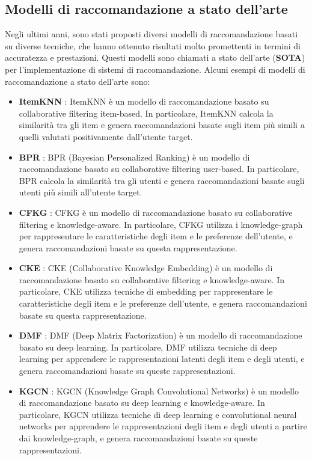 \subsection{Modelli di raccomandazione a stato dell'arte}
Negli ultimi anni, sono stati proposti diversi modelli di raccomandazione basati su diverse tecniche, che hanno ottenuto risultati molto promettenti in termini di accuratezza e prestazioni. Questi modelli sono chiamati a stato dell'arte (\textbf{SOTA}) per l'implementazione di sistemi di raccomandazione. Alcuni esempi di modelli di raccomandazione a stato dell'arte sono:
\begin{itemize}
    \item \textbf{ItemKNN} \cite{ItemKNN}: ItemKNN è un modello di raccomandazione basato su collaborative filtering item-based. In particolare, ItemKNN calcola la similarità tra gli item e genera raccomandazioni basate sugli item più simili a quelli valutati positivamente dall'utente target.
    \item \textbf{BPR} \cite{BPR}: BPR (Bayesian Personalized Ranking) è un modello di raccomandazione basato su collaborative filtering user-based. In particolare, BPR calcola la similarità tra gli utenti e genera raccomandazioni basate sugli utenti più simili all'utente target.
    \item \textbf{CFKG} \cite{CFKG}: CFKG è un modello di raccomandazione basato su collaborative filtering e knowledge-aware. In particolare, CFKG utilizza i knowledge-graph per rappresentare le caratteristiche degli item e le preferenze dell'utente, e genera raccomandazioni basate su questa rappresentazione.
    \item \textbf{CKE} \cite{CKE}: CKE (Collaborative Knowledge Embedding) è un modello di raccomandazione basato su collaborative filtering e knowledge-aware. In particolare, CKE utilizza tecniche di embedding per rappresentare le caratteristiche degli item e le preferenze dell'utente, e genera raccomandazioni basate su questa rappresentazione.
    \item \textbf{DMF} \cite{DMF}: DMF (Deep Matrix Factorization) è un modello di raccomandazione basato su deep learning. In particolare, DMF utilizza tecniche di deep learning per apprendere le rappresentazioni latenti degli item e degli utenti, e genera raccomandazioni basate su queste rappresentazioni.
    \item \textbf{KGCN} \cite{KGCN}: KGCN (Knowledge Graph Convolutional Networks) è un modello di raccomandazione basato su deep learning e knowledge-aware. In particolare, KGCN utilizza tecniche di deep learning e convolutional neural networks per apprendere le rappresentazioni degli item e degli utenti a partire dai knowledge-graph, e genera raccomandazioni basate su queste rappresentazioni.

\end{itemize}
